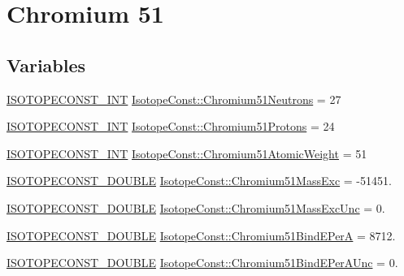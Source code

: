 \hypertarget{group___isotope_const-_chromium-_cr51}{}\section{Chromium 51}
\label{group___isotope_const-_chromium-_cr51}
\subsection*{Variables}
\begin{DoxyCompactItemize}
\item 
\mbox{\hyperlink{group___isotope_const-_macros_ga5f18360b3e99483a35c32d789e62621c}{I\+S\+O\+T\+O\+P\+E\+C\+O\+N\+S\+T\+\_\+\+I\+NT}} \mbox{\hyperlink{group___isotope_const-_chromium-_cr51_ga537e6a82202060ed9ab0cdbfe06d6ca6}{Isotope\+Const\+::\+Chromium51\+Neutrons}} = 27
\item 
\mbox{\hyperlink{group___isotope_const-_macros_ga5f18360b3e99483a35c32d789e62621c}{I\+S\+O\+T\+O\+P\+E\+C\+O\+N\+S\+T\+\_\+\+I\+NT}} \mbox{\hyperlink{group___isotope_const-_chromium-_cr51_ga99c3dd09c6b8cde3c1da877188fd39d9}{Isotope\+Const\+::\+Chromium51\+Protons}} = 24
\item 
\mbox{\hyperlink{group___isotope_const-_macros_ga5f18360b3e99483a35c32d789e62621c}{I\+S\+O\+T\+O\+P\+E\+C\+O\+N\+S\+T\+\_\+\+I\+NT}} \mbox{\hyperlink{group___isotope_const-_chromium-_cr51_ga252f84a5a47bc6136583dff8d284f39d}{Isotope\+Const\+::\+Chromium51\+Atomic\+Weight}} = 51
\item 
\mbox{\hyperlink{group___isotope_const-_macros_ga8f45a7272ce02c0b4c65c44636ed719a}{I\+S\+O\+T\+O\+P\+E\+C\+O\+N\+S\+T\+\_\+\+D\+O\+U\+B\+LE}} \mbox{\hyperlink{group___isotope_const-_chromium-_cr51_ga0ca3ebdc93d9a9bb675717b0c7fbac95}{Isotope\+Const\+::\+Chromium51\+Mass\+Exc}} = -\/51451.
\item 
\mbox{\hyperlink{group___isotope_const-_macros_ga8f45a7272ce02c0b4c65c44636ed719a}{I\+S\+O\+T\+O\+P\+E\+C\+O\+N\+S\+T\+\_\+\+D\+O\+U\+B\+LE}} \mbox{\hyperlink{group___isotope_const-_chromium-_cr51_gae401f0fff7bea1e2493740f2d0141af2}{Isotope\+Const\+::\+Chromium51\+Mass\+Exc\+Unc}} = 0.
\item 
\mbox{\hyperlink{group___isotope_const-_macros_ga8f45a7272ce02c0b4c65c44636ed719a}{I\+S\+O\+T\+O\+P\+E\+C\+O\+N\+S\+T\+\_\+\+D\+O\+U\+B\+LE}} \mbox{\hyperlink{group___isotope_const-_chromium-_cr51_ga65ef4dd2b8782c95b6bc7e6287cbb69f}{Isotope\+Const\+::\+Chromium51\+Bind\+E\+PerA}} = 8712.
\item 
\mbox{\hyperlink{group___isotope_const-_macros_ga8f45a7272ce02c0b4c65c44636ed719a}{I\+S\+O\+T\+O\+P\+E\+C\+O\+N\+S\+T\+\_\+\+D\+O\+U\+B\+LE}} \mbox{\hyperlink{group___isotope_const-_chromium-_cr51_gaafffe734162fb837808705ea34a6c712}{Isotope\+Const\+::\+Chromium51\+Bind\+E\+Per\+A\+Unc}} = 0.

\end{DoxyCompactItemize}
